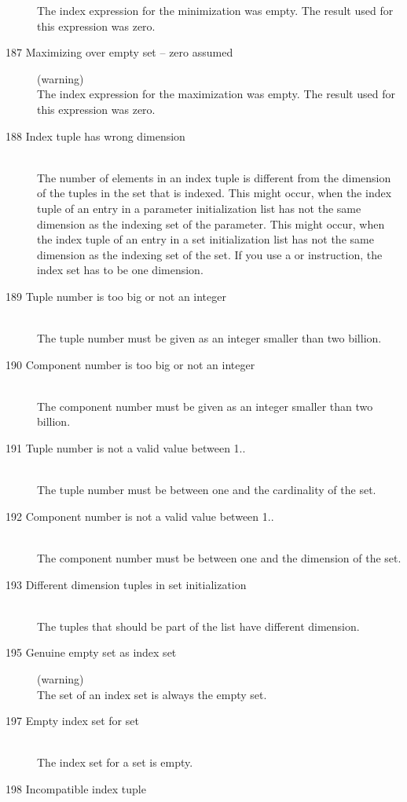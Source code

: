 \begin{description}
   The index expression for the minimization was empty. The result
   used for this expression was zero.
\item[187 Maximizing over empty set -- zero assumed] (warning)\ \\
   The index expression for the maximization was empty. The result
   used for this expression was zero.
\item[188 Index tuple has wrong dimension]\ \\
   The number of elements in an index tuple is different from the
   dimension of the tuples in the set that is indexed.
   This might occur, when the index tuple of an entry in a parameter initialization list has
   not the same dimension as the indexing set of the parameter. 
   This might occur, when the index tuple of an entry in a set
   initialization list has
   not the same dimension as the indexing set of the set. 
   If you use a  or  instruction, the index
   set has to be one dimension.
\item[189 Tuple number \code{xxx} is too big or not an integer]\ \\
  The tuple number must be given as an integer smaller than two
  billion.
\item[190 Component number \code{xxx} is too big or not an integer]\ \\
  The component number must be given as an integer smaller than two
  billion.
\item[191 Tuple number \code{xxx} is not a valid value between 1..\code{yyy}]\ \\
  The tuple number must be between one and the cardinality of the set.
\item[192 Component number \code{xxx} is not a valid value between 1..\code{yyy}]\ \\
  The component number must be between one and the dimension of the set.
\item[193 Different dimension tuples in set initialization]\ \\
  The tuples that should be part of the list have different dimension.
\item[195 Genuine empty set as index set] (warning)\ \\
  The set of an index set is always the empty set.
\item[197 Empty index set for set]\ \\
  The index set for a set is empty.
\item[198 Incompatible index tuple]\ \\

\end{description}
